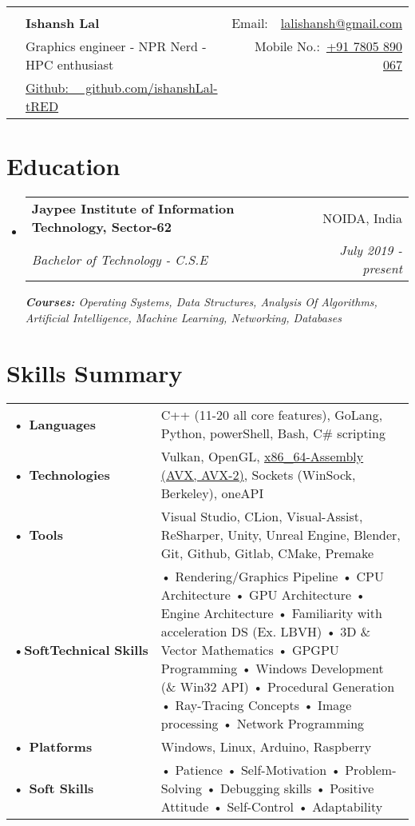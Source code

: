 \documentclass[a4paper,10pt]{article}
\makeatletter
\newcommand{\resumeSubheading}[4]{
  \vspace{-1pt}\item
    \begin{tabular*}{0.97\textwidth}{l@{\extracolsep{\fill}}r}
      \textbf{#1} & #2 \\
      \textit{#3} & \textit{#4} \\
    \end{tabular*}\vspace{-5pt}
}
\newcommand{\resumeSubHeadingListStart}{\begin{itemize}[leftmargin=*]}
\newcommand{\resumeSubHeadingListEnd}{\end{itemize}}
\newcommand{\photo}[1]{\begin{tikzpicture}\clip (0,0) circle (1.1cm) node {\texttt{[image: \#1]}};\end{tikzpicture}}
\makeatother
\begin{document}
\begin{tabular*}{\textwidth}{c l@{\extracolsep{\fill}}r}
  \multirow{4}{*}{\photo{me-cropped}} \\
   & \textbf{{\LARGE Ishansh Lal}} & Email:~~\href{mailto:}{lalishansh@gmail.com}\\
   & Graphics engineer - NPR Nerd - HPC enthusiast & Mobile No.:~\href{tel:917805890067}{+91 7805 890 067}\\
   & \href{https://github.com/ishanshLal-tRED}{Github: ~~github.com/ishanshLal-tRED} \\
\end{tabular*}
\section{Education}
  \resumeSubHeadingListStart
    \resumeSubheading
      {Jaypee Institute of Information Technology, Sector-62}{NOIDA, India}
      {Bachelor of Technology - C.S.E}{July 2019 - present}
      {\scriptsize \textit{ \footnotesize{\newline{}\textbf{Courses:} Operating Systems, Data Structures, Analysis Of Algorithms, Artificial Intelligence, Machine Learning, Networking, Databases}}}\\
    \resumeSubHeadingListEnd
\vspace{-6pt}
\section{Skills Summary}
\begin{tabular}{p{}p{}}
    \textbf{• Languages}&{C++ (11-20 all core features), GoLang, Python, powerShell, Bash, C\# scripting}\\
    \textbf{• Technologies}&{Vulkan, OpenGL, \url{x86_64-Assembly (AVX, AVX-2)}, Sockets (WinSock, Berkeley), oneAPI}\\
    \textbf{• Tools}&{Visual Studio, CLion, Visual-Assist, ReSharper, Unity, Unreal Engine, Blender, Git, Github, Gitlab, CMake, Premake}\\
    \textbf{•\hspace{5pt}SoftTechnical\hspace{15pt}\textcolor{white}{!}\hspace{7pt}Skills}&{• Rendering/Graphics Pipeline • CPU Architecture • GPU Architecture • Engine Architecture • Familiarity with acceleration DS (Ex. LBVH) • 3D \& Vector Mathematics • GPGPU Programming • Windows Development (\& Win32 API) • Procedural Generation • Ray-Tracing Concepts • Image processing • Network Programming}\\
    \textbf{• Platforms}&{Windows, Linux, Arduino, Raspberry}\\
    \textbf{• Soft Skills}&{• Patience • Self-Motivation • Problem-Solving • Debugging skills • Positive Attitude • Self-Control • Adaptability}
\end{tabular}
\vspace{-2pt}
\end{document}
